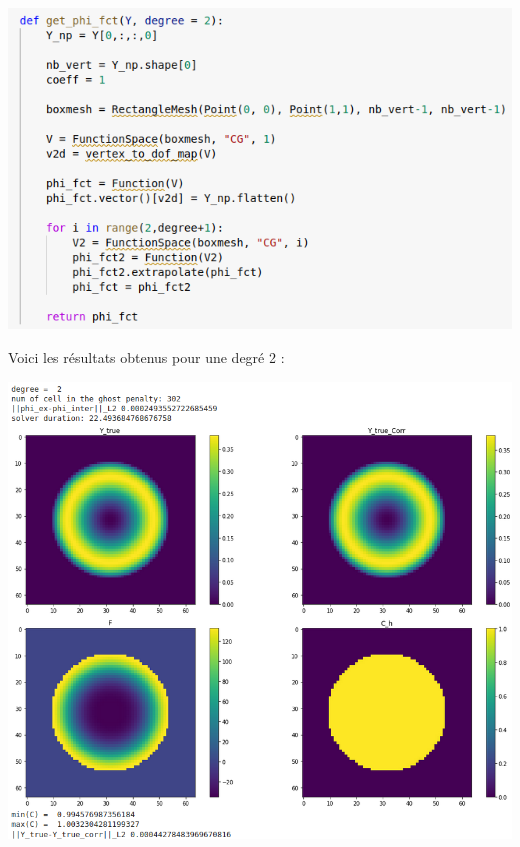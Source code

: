 \begin{minipage}{\linewidth}
	\centering
	\includegraphics[width=0.5\linewidth]{get_phi_fct.png}
\end{minipage}

Voici les résultats obtenus pour une degré 2 :

\begin{minipage}{\linewidth}
	\centering
	\includegraphics[width=0.9\linewidth]{results_extrapolate.png}
\end{minipage}


